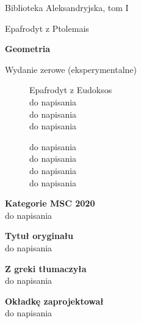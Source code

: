 \documentclass{parchment}
\begin{document}
\thispagestyle{empty}
{\noindent\fontsize{18pt}{18pt}\selectfont Biblioteka Aleksandryjska, tom I}

\noindent\makebox[\linewidth]{\rule{\textwidth}{1pt}}

\newpage

\thispagestyle{empty}
\phantom{nothing}
\newpage

\thispagestyle{empty}
{\noindent\fontsize{18pt}{18pt}\selectfont Epafrodyt z Ptolemais}

\noindent\makebox[\linewidth]{\rule{\textwidth}{1pt}}

\vspace{10mm}

{\noindent\fontsize{24pt}{24pt}\selectfont \textbf{Geometria}}
\vspace{10mm}

{\noindent\fontsize{14pt}{14pt}\selectfont Wydanie zerowe (eksperymentalne)}

\newpage

\thispagestyle{empty}
\begin{figure}[H]
\begin{minipage}[b]{.48\linewidth}
{\noindent Epafrodyt z Eudoksos\\
do napisania\\
do napisania\\
do napisania}
\end{minipage}
\begin{minipage}[b]{.48\linewidth}
{\noindent do napisania\\
do napisania\\
do napisania\\
do napisania}
\end{minipage}
\end{figure}

{\noindent \textbf{Kategorie MSC 2020}\\do napisania} \vspace{5mm}

{\noindent \textbf{Tytuł oryginału}\\do napisania} \vspace{5mm}

{\noindent \textbf{Z greki tłumaczyła}\\do napisania} \vspace{5mm}

{\noindent \textbf{Okładkę zaprojektował}\\do napisania} \vspace{5mm}
\end{document}
